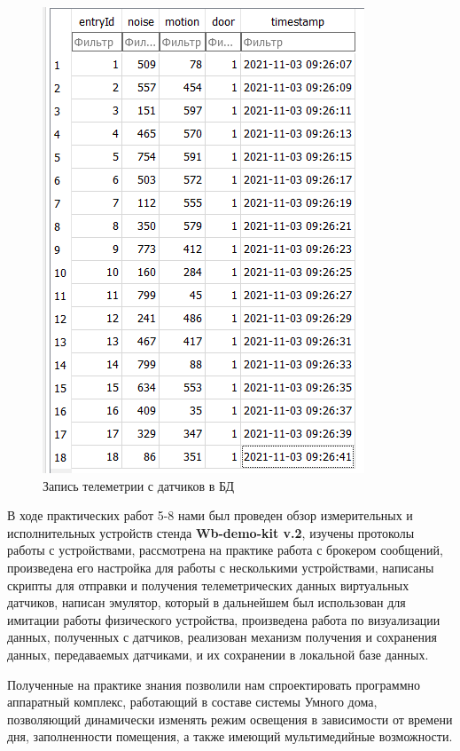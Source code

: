 \documentclass[a4paper,14pt]{extarticle}
\newcommand{\stend}{\textbf{Wb-demo-kit v.2}}
\begin{document}
\begin{problem}
\begin{figure}[htpb]
	\centering
	\includegraphics[width=0.8\linewidth]{images/task8-dop-db}
	\caption{Запись телеметрии с датчиков в БД}
	\label{fig:task8-dop-db}
\end{figure}

	
\end{problem}
	

\newpage

В ходе практических работ 5-8 нами был проведен обзор измерительных и исполнительных устройств стенда \stend, изучены протоколы работы с устройствами, рассмотрена на практике работа с брокером сообщений, произведена его настройка для работы с несколькими устройствами, написаны скрипты для отправки и получения телеметрических данных виртуальных датчиков, написан эмулятор, который в дальнейшем был использован для имитации работы физического устройства, произведена работа по визуализации данных, полученных с датчиков, реализован механизм получения и сохранения данных, передаваемых датчиками, и их сохранении в локальной базе данных. 

Полученные на практике знания позволили нам спроектировать программно аппаратный комплекс, работающий в составе системы Умного дома, позволяющий динамически изменять режим освещения в зависимости от времени дня, заполненности помещения, а также имеющий мультимедийные возможности.
\newpage
\end{document}
